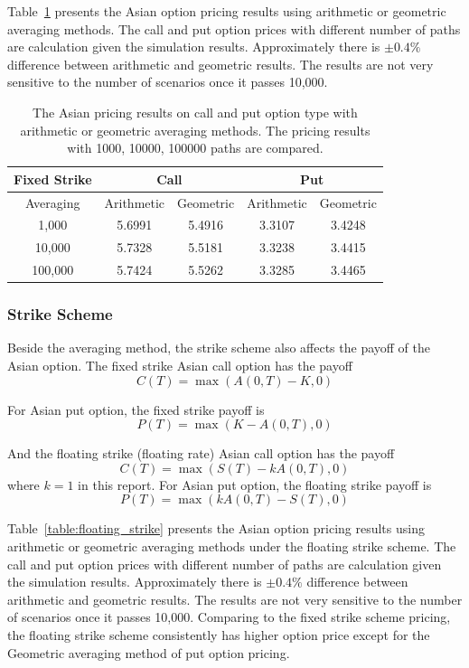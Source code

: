 \documentclass[a4paper,11pt] {article}
\begin{document}
Table~\ref{table:fixed_strike} presents the Asian option pricing results using arithmetic or geometric averaging methods. The call and put option prices with different number of paths are calculation given the simulation results. Approximately there is $\pm 0.4 \%$ difference between arithmetic and geometric results. The results are not very sensitive to the number of scenarios once it passes 10,000. 

\begin{table}[htb]
\begin{center}
\begin{tabular}{c||c|c|c|c}
  \hline
  Fixed Strike & \multicolumn{2}{c|}{Call} & \multicolumn{2}{c}{Put} \\ \hline
  Averaging & Arithmetic & Geometric & Arithmetic & Geometric \\ \hline
  1,000 & 5.6991 & 5.4916 & 3.3107 & 3.4248 \\
  10,000 & 5.7328 & 5.5181 & 3.3238 & 3.4415 \\
  100,000 & 5.7424 & 5.5262 & 3.3285 & 3.4465 \\
  \hline
\end{tabular}
\caption{The Asian pricing results on call and put option type with arithmetic or geometric averaging methods. The pricing results with 1000, 10000, 100000 paths are compared.}
\label{table:fixed_strike}
\end{center}
\end{table}


\subsubsection{Strike Scheme}
Beside the averaging method, the strike scheme also affects the payoff of the Asian option. The fixed strike Asian call option has the payoff
$$
C(T) = \max(A(0,T)-K,0)
$$

For Asian put option, the fixed strike payoff is
$$
P(T) = \max(K-A(0,T),0)
$$

And the floating strike (floating rate) Asian call option has the payoff
$$
C(T) = \max(S(T)-kA(0,T),0)
$$
where $k=1$ in this report. For Asian put option, the floating strike payoff is
$$
P(T) = \max(kA(0,T)-S(T),0)
$$

Table~\ref{table:floating_strike} presents the Asian option pricing results using arithmetic or geometric averaging methods under the floating strike scheme. The call and put option prices with different number of paths are calculation given the simulation results. Approximately there is $\pm 0.4 \%$ difference between arithmetic and geometric results. The results are not very sensitive to the number of scenarios once it passes 10,000. Comparing to the fixed strike scheme pricing, the floating strike scheme consistently has higher option price except for the Geometric averaging method of put option pricing.
\end{document}
